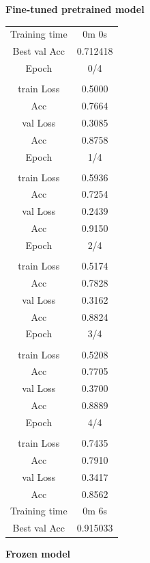 \documentclass[12 pt]{article}        	%
\begin{document}
\begin{multicols}{2}

\textbf{Fine-tuned pretrained model} \\

\begin{tabular}{ | c | c | } \hline
  Training time & 0m 0s \\
  Best val Acc & 0.712418 \\
  Epoch & 0/4 \\ \hline
        & \\
  train Loss & 0.5000 \\
  Acc & 0.7664 \\
  val Loss & 0.3085 \\
  Acc & 0.8758 \\
  Epoch & 1/4 \\ \hline
         & \\
  train Loss & 0.5936 \\
  Acc & 0.7254 \\
  val Loss & 0.2439 \\
  Acc & 0.9150 \\
  Epoch & 2/4 \\ \hline
        & \\
  train Loss & 0.5174 \\
  Acc & 0.7828 \\
  val Loss & 0.3162 \\
  Acc & 0.8824 \\
  Epoch & 3/4 \\ \hline
        & \\
  train Loss & 0.5208 \\
  Acc & 0.7705 \\
  val Loss & 0.3700 \\
  Acc & 0.8889 \\
  Epoch & 4/4 \\ \hline
        & \\
  train Loss & 0.7435 \\
  Acc & 0.7910 \\
  val Loss & 0.3417 \\
  Acc & 0.8562 \\
  Training time & 0m 6s \\
  Best val Acc & 0.915033 \\ \hline
\end{tabular}

\textbf{Frozen model} \\


\end{multicols}
\end{document}
